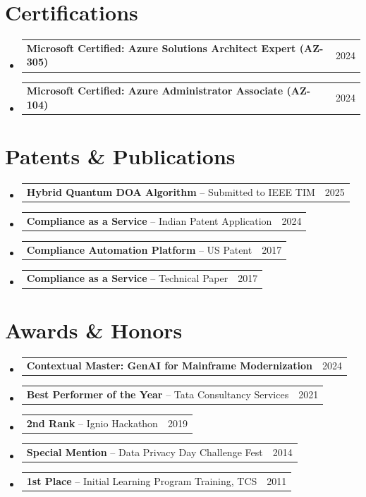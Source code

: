 \documentclass[11pt,a4paper]{article}
\makeatletter
\newcommand{\resumeProjectHeading}[2]{
    \item
    \begin{tabular*}{0.97\textwidth}{l@{\extracolsep{\fill}}r}
      \small#1 & #2 \\
    \end{tabular*}\vspace{-7pt}
}
\newcommand{\resumeSubHeadingListStart}{\begin{itemize}[leftmargin=0.15in, label={}]}
\newcommand{\resumeSubHeadingListEnd}{\end{itemize}}
\makeatother
\begin{document}
\section{Certifications}
\resumeSubHeadingListStart
  \resumeProjectHeading
    {\textbf{Microsoft Certified: Azure Solutions Architect Expert (AZ-305)}}{2024}
  \resumeProjectHeading
    {\textbf{Microsoft Certified: Azure Administrator Associate (AZ-104)}}{2024}
\resumeSubHeadingListEnd

\section{Patents \& Publications}
\resumeSubHeadingListStart
  \resumeProjectHeading
    {\textbf{Hybrid Quantum DOA Algorithm} -- Submitted to IEEE TIM}{2025}
  \resumeProjectHeading
    {\textbf{Compliance as a Service} -- Indian Patent Application}{2024}
  \resumeProjectHeading
    {\textbf{Compliance Automation Platform} -- US Patent}{2017}
  \resumeProjectHeading
    {\textbf{Compliance as a Service} -- Technical Paper}{2017}
\resumeSubHeadingListEnd

\section{Awards \& Honors}
\resumeSubHeadingListStart
  \resumeProjectHeading
    {\textbf{Contextual Master: GenAI for Mainframe Modernization}}{2024}
  \resumeProjectHeading
    {\textbf{Best Performer of the Year} -- Tata Consultancy Services}{2021}
  \resumeProjectHeading
    {\textbf{2nd Rank} -- Ignio Hackathon}{2019}
  \resumeProjectHeading
    {\textbf{Special Mention} -- Data Privacy Day Challenge Fest}{2014}
  \resumeProjectHeading
    {\textbf{1st Place} -- Initial Learning Program Training, TCS}{2011}
\resumeSubHeadingListEnd
\end{document}
